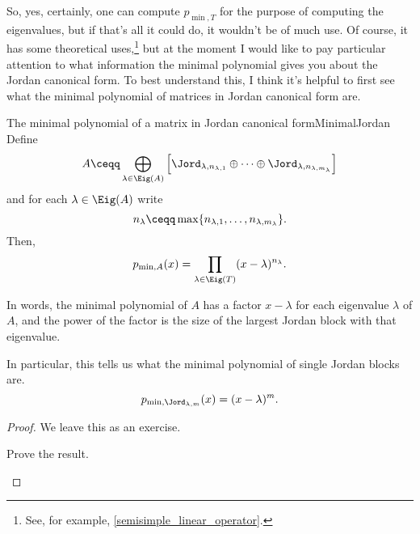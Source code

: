 So, yes, certainly, one can compute $p_{\min ,T}$ for the purpose of computing the eigenvalues, but if that's all it could do, it wouldn't be of much use.  Of course, it has some theoretical uses,\footnote{See, for example, \cref{semisimple_linear_operator}.} but at the moment I would like to pay particular attention to what information the minimal polynomial gives you about the Jordan canonical form.  To best understand this, I think it's helpful to first see what the minimal polynomial of matrices in Jordan canonical form are.
\begin{prp}{The minimal polynomial of a matrix in Jordan canonical form}{MinimalJordan}
	Define
	\begin{equation}
		A\ceqq \bigoplus _{\lambda \in \Eig (A)}\left[ \Jord _{\lambda ,n_{\lambda ,1}}\oplus \cdots \oplus \Jord _{\lambda ,n_{\lambda ,m_{\lambda}}}\right ]
	\end{equation}
	and for each $\lambda \in \Eig (A)$ write
	\begin{equation}
		n_{\lambda}\ceqq \max \{ n_{\lambda ,1},\ldots ,n_{\lambda ,m_{\lambda}}\} .
	\end{equation}
	Then,
	\begin{equation}
		p_{\min ,A}(x)=\prod _{\lambda \in \Eig (T)}(x-\lambda )^{n_{\lambda}}.
	\end{equation}
	\begin{rmk}
		In words, the minimal polynomial of $A$ has a factor $x-\lambda$ for each eigenvalue $\lambda$ of $A$, and the power of the factor is the size of the largest Jordan block with that eigenvalue.
	\end{rmk}
	\begin{rmk}
		In particular, this tells us what the minimal polynomial of single Jordan blocks are.
		\begin{equation}
			p_{\min ,\Jord _{\lambda ,m}}(x)=(x-\lambda )^m.
		\end{equation}
	\end{rmk}
	\begin{proof}
		We leave this as an exercise.
		\begin{exr}[breakable=false]{}{}
			Prove the result.
		\end{exr}
	\end{proof}
\end{prp}
